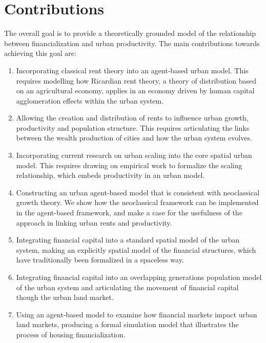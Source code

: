 \section{Contributions}
The overall goal is to provide a theoretically grounded model of the relationship between financialization and urban productivity. The main contributions towards achieving this goal are:
\begin{enumerate}
    \item  Incorporating \gls{classical rent theory} into an \gls{agent-based} urban model. This requires modelling how \gls{Ricardian rent theory}, a theory of distribution based on an agricultural economy, applies in an economy driven by human capital \gls{agglomeration} effects within the urban system. 

    \item Allowing the creation and distribution of rents to influence urban growth, productivity and population structure. This requires articulating the links between the wealth production of cities and how the urban system evolves.

    \item Incorporating current research on \gls{urban scaling} into the core spatial urban model.  This requires drawing on empirical work to formalize the scaling relationship, which embeds productivity in an urban model. 

    \item Constructing an urban \gls{agent-based model} that is consistent with {neoclassical growth theory}. We show how the neoclassical framework can be implemented in the agent-based framework, and make a case for the usefulness of the approach in linking urban rents and productivity. 

    \item Integrating \gls{financial capital} into a standard spatial model of the urban system, making an explicitly spatial model of the financial structures, which have traditionally been formalized in a spaceless way.
    
    \item Integrating financial capital into an \gls{overlapping generations} population model of the urban system and articulating the movement of financial capital though the urban land market. 
    
    \item Using an agent-based model to examine how financial markets impact urban \glspl{land market}, producing a formal simulation model that illustrates the process of housing financialization. 


\end{enumerate}
